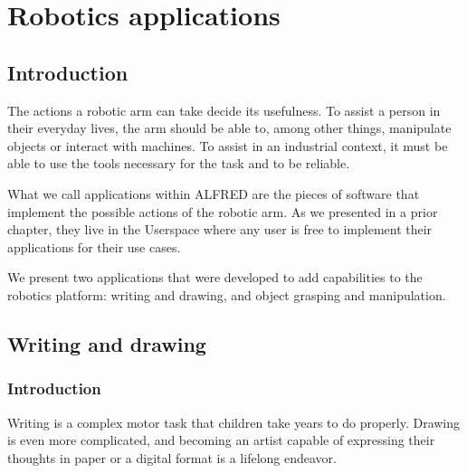 \chapter{Robotics applications}



\section{Introduction}

The actions a robotic arm can take decide its usefulness. To assist a person in their everyday lives, the arm should be able to, among other things, manipulate objects or interact with machines. To assist in an industrial context, it must be able to use the tools necessary for the task and to be reliable.

What we call applications within ALFRED are the pieces of software that implement the possible actions of the robotic arm. As we presented in a prior chapter, they live in the Userspace where any user is free to implement their applications for their use cases.

We present two applications that were developed to add capabilities to the robotics platform: writing and drawing, and object grasping and manipulation.









\section{Writing and drawing}


\subsection{Introduction}

Writing is a complex motor task that children take years to do properly. Drawing is even more complicated, and becoming an artist capable of expressing their thoughts in paper or a digital format is a lifelong endeavor.

